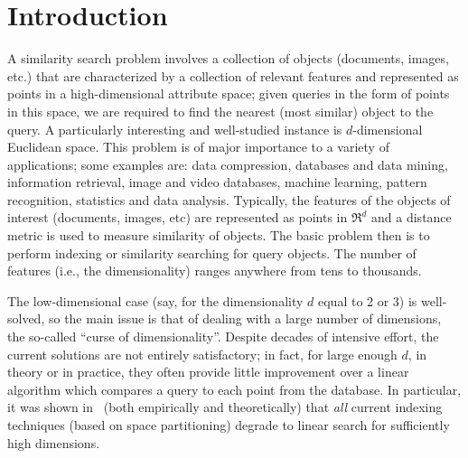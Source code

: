 \documentclass[12pt]{article}
\begin{document}
\section{Introduction}
A similarity search problem involves a collection of objects (documents,
images, etc.) that are characterized by a collection of relevant features
and represented as points in a high-dimensional attribute space; given
queries in the form of points in this space, we are required to find
the nearest (most similar) object to the query.
A particularly interesting and well-studied instance is 
$d$-dimensional Euclidean space.
This problem
is of major importance to a variety of applications;
some examples are:
data compression,
databases and data mining,
information retrieval,
image and video databases,
machine learning, 
pattern recognition,  statistics and data analysis.
Typically, the features of the objects of interest (documents, images, etc)
are represented as points in $\Re^d$ and a distance metric is used to measure
similarity of objects. The basic problem then is to perform indexing or
similarity searching for query objects.
The number of features (i.e., the
dimensionality) ranges anywhere from tens to thousands. 

The low-dimensional case (say, for the dimensionality $d$ equal to 2 or 3) is well-solved,
so the main issue is that of dealing with a large number of dimensions,
the so-called ``curse of dimensionality''. Despite decades
of intensive effort, the current solutions are not entirely satisfactory;
in fact, for large enough $d$, in theory or in practice, they often provide little 
improvement over a linear algorithm which compares a query to each point from the database.
In particular, it was shown in~\cite{Web} (both empirically and theoretically) that {\em all} current indexing techniques (based on space partitioning) degrade to linear search for sufficiently high dimensions.
\end{document}
